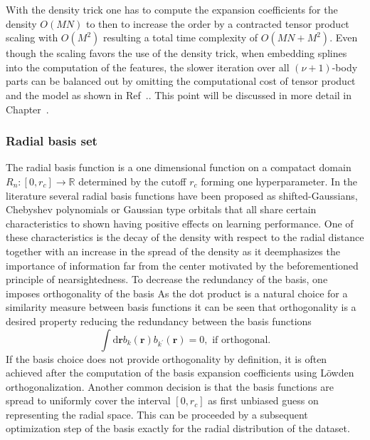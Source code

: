 With the density trick one has to compute the expansion coefficients for the density $O(MN)$ to then to increase the order by a contracted tensor product scaling with $O(M^2)$ resulting a total time complexity of $O(MN+M^2)$.
Even though the scaling favors the use of the density trick, when embedding splines into the computation of the features, the slower iteration over all $(\nu+1)$-body parts can be balanced out by omitting the computational cost of tensor product and the model as shown in Ref~.\cite{xie2023ultra}.
This point will be discussed in more detail in Chapter~\cite{sec:splining}.
\subsubsection{Radial basis set}
\label{sec:radial_basis_set}
The radial basis function is a one dimensional function on a compatact domain $R_n:[0, r_c]\rightarrow\mathbb{R}$ determined by the cutoff $r_c$ forming one hyperparameter.
In the literature several radial basis functions have been proposed as shifted-Gaussians\cite{bartok2013representing}, Chebyshev polynomials\cite{shapeev2016moment,drautz2019atomic} or Gaussian type orbitals\cite{musil2021efficient} that all share certain characteristics to shown having positive effects on learning performance. 
One of these characteristics is the decay of the density with respect to the radial distance 
together with an increase in the spread of the density as it deemphasizes the importance of information far from the center motivated by the beforementioned principle of nearsightedness\cite{prodan2005nearsightedness}.
To decrease the redundancy of the basis, one imposes orthogonality of the basis
As the dot product is a natural choice for a similarity measure between basis functions it can be seen that orthogonality is a desired property reducing the redundancy between the basis functions
\begin{equation}
  \int\mathrm{d}\mathbf{r}b_k(\mathbf{r})b_{k^\prime}(\mathbf{r}) = 0,\textrm{ if orthogonal}.
\end{equation}
If the basis choice does not provide orthogonality by definition, it is often achieved after the computation of the basis expansion coefficients using Löwden orthogonalization\cite{PIELA2014e99}.
Another common decision is that the basis functions are spread to uniformly cover the interval $[0, r_c]$ as first unbiased guess on representing the radial space\cite{schutt2018schnet,dusson2022atomic}.
This can be proceeded by a subsequent optimization step of the basis exactly for the radial distribution of the dataset.
